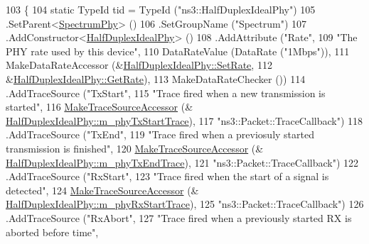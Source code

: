 \begin{DoxyCode}
103 \{
104   \textcolor{keyword}{static} TypeId tid = TypeId (\textcolor{stringliteral}{"ns3::HalfDuplexIdealPhy"})
105     .SetParent<\hyperlink{classns3_1_1SpectrumPhy_a207bd7373a9fd3b7f8d8e00380a0e7e4}{SpectrumPhy}> ()
106     .SetGroupName (\textcolor{stringliteral}{"Spectrum"})
107     .AddConstructor<\hyperlink{classns3_1_1HalfDuplexIdealPhy_ae2c8e7505a1e3850f9bef6517c22a614}{HalfDuplexIdealPhy}> ()
108     .AddAttribute (\textcolor{stringliteral}{"Rate"},
109                    \textcolor{stringliteral}{"The PHY rate used by this device"},
110                    DataRateValue (DataRate (\textcolor{stringliteral}{"1Mbps"})),
111                    MakeDataRateAccessor (&\hyperlink{classns3_1_1HalfDuplexIdealPhy_a24f7594f5b76f4f426aa52268bbc3363}{HalfDuplexIdealPhy::SetRate},
112                                          &\hyperlink{classns3_1_1HalfDuplexIdealPhy_a65a835e89eb30731106f4aa506057649}{HalfDuplexIdealPhy::GetRate}),
113                    MakeDataRateChecker ())
114     .AddTraceSource (\textcolor{stringliteral}{"TxStart"},
115                      \textcolor{stringliteral}{"Trace fired when a new transmission is started"},
116                      \hyperlink{group__tracing_gab21a770b9855af4e8f69f7531ea4a6b0}{MakeTraceSourceAccessor} (&
      \hyperlink{classns3_1_1HalfDuplexIdealPhy_a67000e94f4c6a40b808ff6c95fefdf7f}{HalfDuplexIdealPhy::m\_phyTxStartTrace}),
117                      \textcolor{stringliteral}{"ns3::Packet::TraceCallback"})
118     .AddTraceSource (\textcolor{stringliteral}{"TxEnd"},
119                      \textcolor{stringliteral}{"Trace fired when a previosuly started transmission is finished"},
120                      \hyperlink{group__tracing_gab21a770b9855af4e8f69f7531ea4a6b0}{MakeTraceSourceAccessor} (&
      \hyperlink{classns3_1_1HalfDuplexIdealPhy_af3d6bb6dbc089478104c50415d6e1faa}{HalfDuplexIdealPhy::m\_phyTxEndTrace}),
121                      \textcolor{stringliteral}{"ns3::Packet::TraceCallback"})
122     .AddTraceSource (\textcolor{stringliteral}{"RxStart"},
123                      \textcolor{stringliteral}{"Trace fired when the start of a signal is detected"},
124                      \hyperlink{group__tracing_gab21a770b9855af4e8f69f7531ea4a6b0}{MakeTraceSourceAccessor} (&
      \hyperlink{classns3_1_1HalfDuplexIdealPhy_a478247db0193dac5342a70e56384b7c2}{HalfDuplexIdealPhy::m\_phyRxStartTrace}),
125                      \textcolor{stringliteral}{"ns3::Packet::TraceCallback"})
126     .AddTraceSource (\textcolor{stringliteral}{"RxAbort"},
127                      \textcolor{stringliteral}{"Trace fired when a previously started RX is aborted before time"},

\end{DoxyCode}
